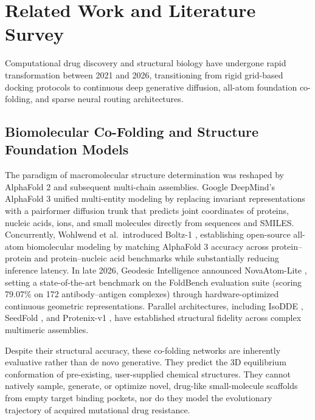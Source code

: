 \section{Related Work and Literature Survey}
\label{sec:related}
Computational drug discovery and structural biology have undergone rapid transformation between 2021 and 2026, transitioning from rigid grid-based docking protocols to continuous deep generative diffusion, all-atom foundation co-folding, and sparse neural routing architectures.

\subsection{Biomolecular Co-Folding and Structure Foundation Models}
The paradigm of macromolecular structure determination was reshaped by AlphaFold 2 and subsequent multi-chain assemblies. Google DeepMind's AlphaFold 3 \cite{abramson2024accurate} unified multi-entity modeling by replacing invariant representations with a pairformer diffusion trunk that predicts joint coordinates of proteins, nucleic acids, ions, and small molecules directly from sequences and SMILES. Concurrently, Wohlwend et al.\ introduced Boltz-1 \cite{wohlwend2024boltz1}, establishing open-source all-atom biomolecular modeling by matching AlphaFold 3 accuracy across protein--protein and protein--nucleic acid benchmarks while substantially reducing inference latency. In late 2026, Geodesic Intelligence announced NovaAtom-Lite \cite{geodesic2026novaatom}, setting a state-of-the-art benchmark on the FoldBench evaluation suite (scoring 79.07\% on 172 antibody--antigen complexes) through hardware-optimized continuous geometric representations. Parallel architectures, including IsoDDE \cite{fedde2023isodde}, SeedFold \cite{fedoseev2024seedfold}, and Protenix-v1 \cite{zheng2024protenix}, have established structural fidelity across complex multimeric assemblies.

Despite their structural accuracy, these co-folding networks are inherently evaluative rather than de novo generative. They predict the 3D equilibrium conformation of pre-existing, user-supplied chemical structures. They cannot natively sample, generate, or optimize novel, drug-like small-molecule scaffolds from empty target binding pockets, nor do they model the evolutionary trajectory of acquired mutational drug resistance.

